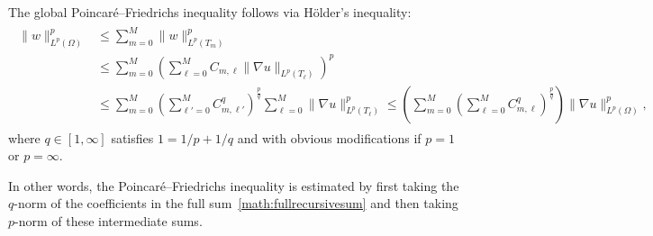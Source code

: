 \documentclass[10pt,a4paper]{article}
\begin{document}
\begin{remark}
    The global Poincar\'e--Friedrichs inequality follows via H\"older's inequality:
    \begin{align*}
        \begin{split}
            \| w \|_{L^{p}(\Omega)}^{p}
            &
            \leq 
            \sum_{m=0}^{M}
            \| w \|_{L^{p}(T_{m})}^{p}
            \\&
            \leq 
            \sum_{m=0}^{M}
            \left( \sum_{\ell=0}^{M} C_{m,\ell} \| \nabla u \|_{L^{p}(T_{\ell})} \right)^{p}
            \\&
            \leq 
            \sum_{m=0}^{M}
            \left( \sum_{\ell'=0}^{M} C_{m,\ell'}^{q} \right)^{\frac p q}
            \sum_{\ell=0}^{M} 
            \| \nabla u \|_{L^{p}(T_{\ell})}^{p} 
            \leq 
            \left(
                \sum_{m=0}^{M}
                \left( \sum_{\ell=0}^{M} C_{m,\ell}^{q} \right)^{\frac p q}
            \right)
            \| \nabla u \|_{L^{p}(\Omega)}^{p} 
            ,
        \end{split}
    \end{align*}
    where $q \in [1,\infty]$ satisfies $1 = 1/p + 1/q$ and with obvious modifications if $p=1$ or $p=\infty$. 
    
    In other words, the Poincar\'e--Friedrichs inequality is estimated by first taking the $q$-norm of the coefficients in the full sum~\eqref{math:fullrecursivesum} and then taking $p$-norm of these intermediate sums.
\end{remark}
\end{document}
